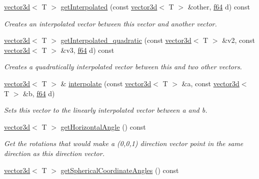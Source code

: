 \begin{DoxyCompactItemize}
\hyperlink{classirr_1_1core_1_1vector3d}{vector3d}$<$ T $>$ \hyperlink{classirr_1_1core_1_1vector3d_aee3351232fa6ebd6241a89bebdaeaedf}{get\+Interpolated} (const \hyperlink{classirr_1_1core_1_1vector3d}{vector3d}$<$ T $>$ \&other, \hyperlink{namespaceirr_a1325b02603ad449f92c68fc640af9b28}{f64} d) const
\begin{DoxyCompactList}\small\item\em Creates an interpolated vector between this vector and another vector. \end{DoxyCompactList}\item 
\hyperlink{classirr_1_1core_1_1vector3d}{vector3d}$<$ T $>$ \hyperlink{classirr_1_1core_1_1vector3d_aacaa4bbf35d509b1264d1e8e2d48360e}{get\+Interpolated\+\_\+quadratic} (const \hyperlink{classirr_1_1core_1_1vector3d}{vector3d}$<$ T $>$ \&v2, const \hyperlink{classirr_1_1core_1_1vector3d}{vector3d}$<$ T $>$ \&v3, \hyperlink{namespaceirr_a1325b02603ad449f92c68fc640af9b28}{f64} d) const
\begin{DoxyCompactList}\small\item\em Creates a quadratically interpolated vector between this and two other vectors. \end{DoxyCompactList}\item 
\hyperlink{classirr_1_1core_1_1vector3d}{vector3d}$<$ T $>$ \& \hyperlink{classirr_1_1core_1_1vector3d_a32a888e0f608a20deee98c794a321c4c}{interpolate} (const \hyperlink{classirr_1_1core_1_1vector3d}{vector3d}$<$ T $>$ \&a, const \hyperlink{classirr_1_1core_1_1vector3d}{vector3d}$<$ T $>$ \&b, \hyperlink{namespaceirr_a1325b02603ad449f92c68fc640af9b28}{f64} d)
\begin{DoxyCompactList}\small\item\em Sets this vector to the linearly interpolated vector between a and b. \end{DoxyCompactList}\item 
\hyperlink{classirr_1_1core_1_1vector3d}{vector3d}$<$ T $>$ \hyperlink{classirr_1_1core_1_1vector3d_a2c622aa988b4ea1d2e381632f99f8015}{get\+Horizontal\+Angle} () const
\begin{DoxyCompactList}\small\item\em Get the rotations that would make a (0,0,1) direction vector point in the same direction as this direction vector. \end{DoxyCompactList}\item 
\hyperlink{classirr_1_1core_1_1vector3d}{vector3d}$<$ T $>$ \hyperlink{classirr_1_1core_1_1vector3d_ae65962051f40aabe305bbb71f1956b95}{get\+Spherical\+Coordinate\+Angles} () const

\end{DoxyCompactItemize}
